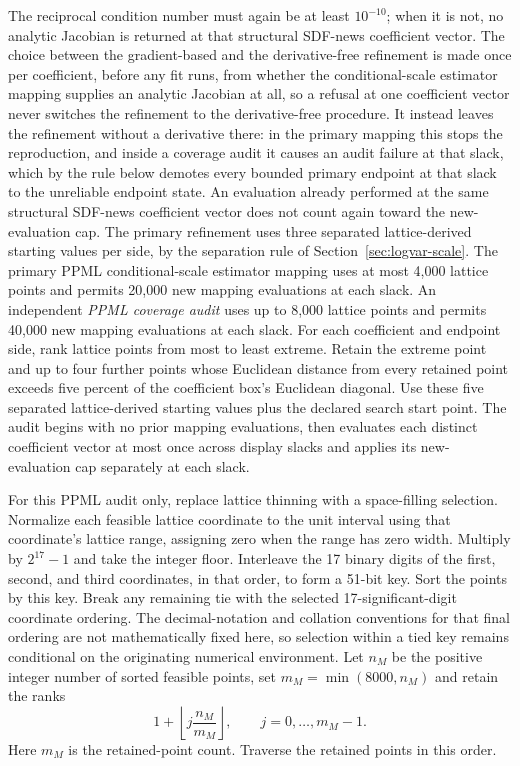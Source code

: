 \documentclass[11pt]{article}
\begin{document}
The reciprocal condition number must again be at least \(10^{-10}\); when it is not, no analytic
Jacobian is returned at that structural SDF-news coefficient vector. The choice between the
gradient-based and the derivative-free refinement is made once per coefficient, before any fit runs,
from whether the conditional-scale estimator mapping supplies an analytic Jacobian at all, so a
refusal at one coefficient vector never switches the refinement to the derivative-free procedure.
It instead leaves the refinement without a derivative there: in the primary mapping this stops the
reproduction, and inside a coverage audit it causes an audit failure at that slack, which by the rule
below demotes every bounded primary endpoint at that slack to the unreliable endpoint state. An evaluation already performed at the same
structural SDF-news coefficient vector does not count again toward the new-evaluation cap. The primary refinement uses
three separated lattice-derived starting values per side, by the separation rule of
Section~\ref{sec:logvar-scale}. The primary PPML
conditional-scale estimator mapping uses at most 4,000 lattice points and permits 20,000 new
mapping evaluations at each slack. An independent \emph{PPML coverage audit} uses up to 8,000
lattice points and permits 40,000 new mapping evaluations at each slack. For each coefficient and endpoint side, rank
lattice points from most to least extreme. Retain the extreme point and up to four further points whose
Euclidean distance from every retained point exceeds five percent of the coefficient box's Euclidean
diagonal. Use these five separated lattice-derived starting values plus the declared search start
point. The audit begins with no prior mapping evaluations, then evaluates each distinct coefficient
vector at most once across display slacks and applies its new-evaluation cap separately at each slack.

For this PPML audit only, replace lattice thinning with a space-filling selection. Normalize each
feasible lattice coordinate to the unit interval using that coordinate's lattice range, assigning
zero when the range has zero width. Multiply by \(2^{17}-1\) and take the integer floor. Interleave
the 17 binary digits of the first, second, and third coordinates, in that order, to form a 51-bit
key. Sort the points by this key. Break any remaining tie with the selected 17-significant-digit
coordinate ordering. The decimal-notation and collation conventions for that final ordering are not
mathematically fixed here, so selection within a tied key remains conditional on the originating
numerical environment. Let
\(n_M\) be the positive integer number of sorted feasible points, set
\(m_M=\min(8000,n_M)\) and retain the ranks
\begin{equation*}
 1+\left\lfloor j\frac{n_M}{m_M}\right\rfloor,
 \qquad j=0,\ldots,m_M-1.
\end{equation*}
Here \(m_M\) is the retained-point count. Traverse the
retained points in this order.
\end{document}

